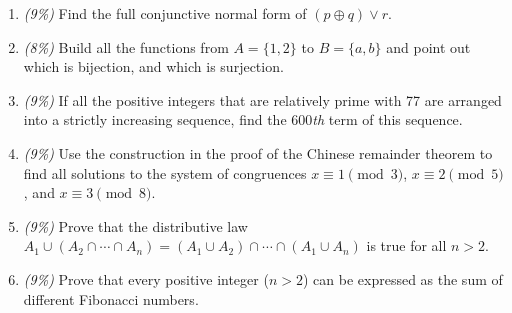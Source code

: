 \documentclass{article}
\begin{document}
\begin{enumerate}
\item
  \emph{(9\%)} Find the full conjunctive normal form of
  \((p\oplus q)\lor r\).
\item
  \emph{(8\%)} Build all the functions from \(A = \{1,2\}\) to
  \(B=\{a,b\}\) and point out which is bijection, and which is
  surjection.
\item
  \emph{(9\%)} If all the positive integers that are relatively prime
  with 77 are arranged into a strictly increasing sequence, find the
  600\emph{th} term of this sequence.
\item
  \emph{(9\%)} Use the construction in the proof of the Chinese
  remainder theorem to find all solutions to the system of congruences
  \(x\equiv1\pmod{3}\), \(x\equiv2\pmod{5}\), and \(x\equiv3\pmod{8}\).
\item
  \emph{(9\%)} Prove that the distributive law
  \(A_1\cup(A_2\cap\cdots\cap A_n)=(A_1\cup A_2)\cap\cdots\cap(A_1\cup A_n)\)
  is true for all \(n > 2\).
\item
  \emph{(9\%)} Prove that every positive integer (\(n>2\)) can be
  expressed as the sum of different Fibonacci numbers.
\end{enumerate}
\end{document}
